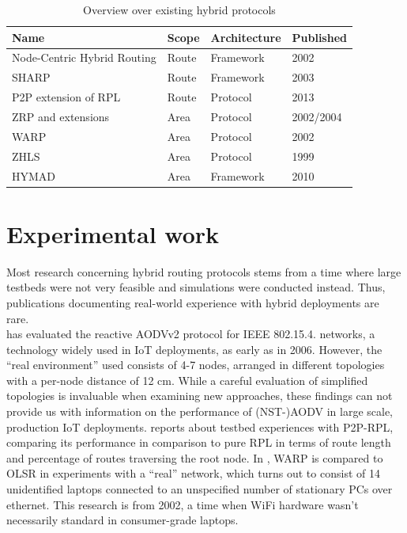 \documentclass[a4paper,10pt]{scrartcl}
\begin{document}
\begin{table}[t]
    \begin{tabular}{p{}|l|l|l}
        Name & Scope & Architecture & Published \\
        \hline
        Node-Centric Hybrid Routing \cite{Roy_nodecentric} & Route & Framework & 2002 \\ %
        \gls{SHARP}\cite{SHARP} & Route & Framework & 2003 \\ %
        P2P extension\cite{RFC-6997} of RPL\cite{RFC-6550} & Route & Protocol & 2013\\
        \gls{ZRP} \cite{ZRP-Draft} and extensions \cite{TZRP} \cite{IZR} & Area & Protocol & 2002/2004\\
        \gls{WARP}\cite{WARP} & Area & Protocol & 2002\\
        \gls{ZHLS}\cite{ZHLS} & Area & Protocol & 1999\\
        \gls{HYMAD}\cite{HYMAD} & Area & Framework & 2010\\ %
    \end{tabular}
    \caption{Overview over existing hybrid protocols}
    \label{fig:overview}
\end{table}

\section{Experimental work}
\label{sec:experiments}
Most research concerning hybrid routing protocols stems from a time where large testbeds were not very feasible and simulations were conducted instead. %
Thus, publications documenting real-world experience with hybrid deployments are rare.\\

\cite{gomez_NSTAODV_eval} has evaluated the reactive AODVv2 protocol for IEEE 802.15.4. networks, a technology widely used in IoT deployments, as early as in 2006. However, the ``real environment'' used consists of 4-7 nodes, arranged in different topologies with a per-node distance of 12 cm. While a careful evaluation of simplified topologies is invaluable when examining new approaches, these findings can not provide us with information on the performance of (NST-)AODV in large scale, production IoT deployments.
\cite{baccelli_p2p_rpl} reports about testbed experiences with P2P-RPL, comparing its performance in comparison to pure RPL in terms of route length and percentage of routes traversing the root node.
In \cite{WARP}, WARP is compared to OLSR in experiments with a ``real'' network, which turns out to consist of 14 unidentified laptops connected to an unspecified number of stationary PCs over ethernet. This research is from 2002, a time when WiFi hardware wasn't necessarily standard in consumer-grade laptops.\\
\end{document}

